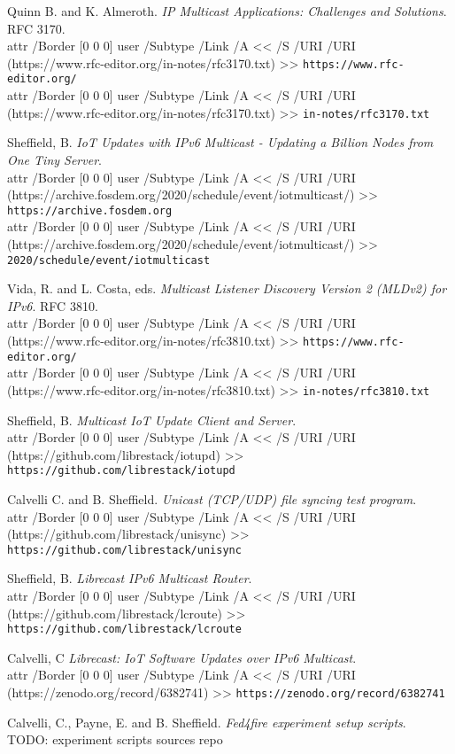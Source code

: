 \documentclass[a4paper,11pt,twocolumn]{article}
\newcommand{\longurl}[2]{%
\pdfstartlink %
attr {/Border [0 0 0]} %
user {/Subtype /Link /A << /S /URI /URI (#1) >>}%
{\footnotesize\tt #2}\pdfendlink}
\newcommand{\url}[1]{\longurl{#1}{#1}}
\newcommand{\url}[1]{{\footnotesize\tt #1}}
\newcommand{\longurl}[2]{{\footnotesize\tt #1}}
\begin{document}

\begin{thebibliography}{99}
\sloppy
{}

  Quinn B. and K. Almeroth.
  {\em IP Multicast Applications: Challenges and Solutions}.
  RFC 3170.\\
  \longurl{https://www.rfc-editor.org/in-notes/rfc3170.txt}%
  {https://www.rfc-editor.org/}\\
  \longurl{https://www.rfc-editor.org/in-notes/rfc3170.txt}%
  {in-notes/rfc3170.txt}

  Sheffield, B.
  {\em IoT Updates with IPv6 Multicast -  Updating a Billion Nodes from One Tiny Server}.\\
    \longurl{https://archive.fosdem.org/2020/schedule/event/iotmulticast/}%
     {https://archive.fosdem.org}\\
    \longurl{https://archive.fosdem.org/2020/schedule/event/iotmulticast/}%
     {2020/schedule/event/iotmulticast}

  Vida, R. and L. Costa, eds.
  {\em Multicast Listener Discovery Version 2 (MLDv2) for IPv6}.
  RFC 3810.\\
  \longurl{https://www.rfc-editor.org/in-notes/rfc3810.txt}%
  {https://www.rfc-editor.org/}\\
  \longurl{https://www.rfc-editor.org/in-notes/rfc3810.txt}%
  {in-notes/rfc3810.txt}

  Sheffield, B.
  {\em Multicast IoT Update Client and Server}.\\
  \url{https://github.com/librestack/iotupd}

  Calvelli C. and B. Sheffield.
  {\em Unicast (TCP/UDP) file syncing test program}.\\
  \url{https://github.com/librestack/unisync}

  Sheffield, B.
  {\em Librecast IPv6 Multicast Router}.\\
  \url{https://github.com/librestack/lcroute}

  Calvelli, C
  {\em Librecast: IoT Software Updates over IPv6 Multicast}.\\
  \url{https://zenodo.org/record/6382741}

  Calvelli, C., Payne, E. and B. Sheffield.
  {\em Fed4fire experiment setup scripts}.\\
  TODO: experiment scripts sources repo


\end{thebibliography}
\end{document}
